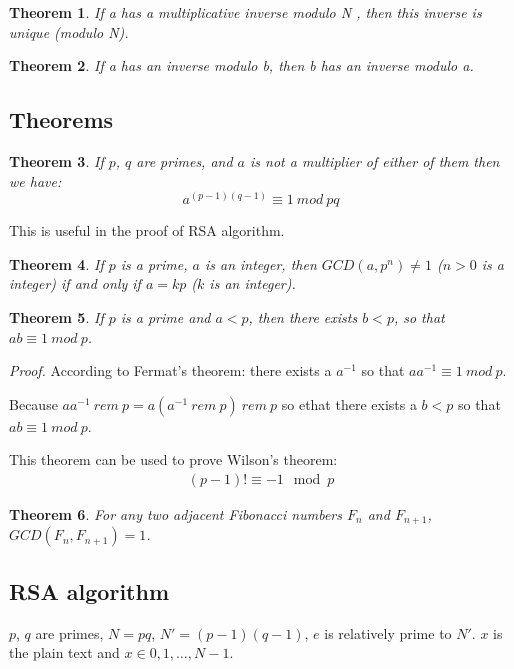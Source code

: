 \documentclass[11pt]{article}
\newtheorem{thm}{Theorem}
\begin{document}
\begin{thm}
  If a has a multiplicative inverse modulo N , then this inverse is
  unique (modulo N).
\end{thm}

\begin{thm}
   If a has an inverse modulo b, then b has an inverse modulo a.
\end{thm}

\subsection{Theorems}

\begin{thm}
  If $p$, $q$ are primes, and $a$ is not a multiplier of either of
  them then we have:
  \begin{equation}
    a^{(p-1)(q-1)}\equiv 1\ mod\ pq
  \end{equation}
\end{thm}
This is useful in the proof of RSA algorithm.

\begin{thm}
  If $p$ is a prime, $a$ is an integer, then $GCD(a, p^n) \neq 1$ ($n
  > 0$ is a integer) if and only if $a=kp$ ($k$ is an integer).
\end{thm}

\begin{thm}
  If $p$ is a prime and $a<p$, then there exists $b<p$, so that
  $ab\equiv 1\ mod\ p$.
\end{thm}
\textit{Proof.} According to Fermat's theorem: there exists a
$a^{-1}$ so that $aa^{-1}\equiv 1\ mod\ p$.

Because $aa^{-1}\ rem\ p = a(a^{-1}\ rem\ p)\ rem\ p$ so ethat there
exists a $b<p$ so that $ab\equiv 1\ mod\ p$.

This theorem can be used to prove Wilson's theorem:
\begin{align}
  (p-1)! \equiv -1 \mod p
\end{align}

\begin{thm}
  For any two adjacent Fibonacci numbers $F_n$ and $F_{n+1}$,
  $GCD(F_{n}, F_{n+1}) = 1$.
\end{thm}


\subsection{RSA algorithm}

$p$, $q$ are primes, $N=pq$, $N'=(p-1)(q-1)$, $e$ is relatively prime
to $N'$. $x$ is the plain text and $x \in {0, 1, \ldots, N-1}$.
\end{document}
